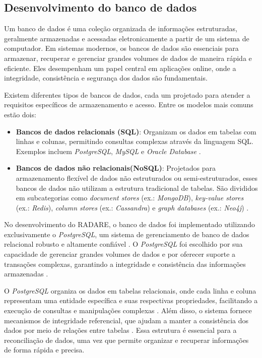 \subsection{Desenvolvimento do banco de dados}

Um banco de dados é uma coleção organizada de informações estruturadas, geralmente armazenadas e acessadas eletronicamente a partir de um sistema de computador. Em sistemas modernos, os bancos de dados são essenciais para armazenar, recuperar e gerenciar grandes volumes de dados de maneira rápida e eficiente. Eles desempenham um papel central em aplicações online, onde a integridade, consistência e segurança dos dados são fundamentais.

Existem diferentes tipos de bancos de dados, cada um projetado para atender a requisitos específicos de armazenamento e acesso. Entre os modelos mais comuns estão dois:

\begin{itemize}
	\item \textbf{Bancos de dados relacionais (SQL)}: Organizam os dados em tabelas com linhas e colunas, permitindo consultas complexas através da linguagem SQL. Exemplos incluem \textit{PostgreSQL}, \textit{MySQL} e \textit{Oracle Database} \cite{relationaldatabases}.

	\item \textbf{Bancos de dados não relacionais(NoSQL)}: Projetados para armazenamento flexível de dados não estruturados ou semi-estruturados, esses bancos de dados não utilizam a estrutura tradicional de tabelas. São divididos em subcategorias como \textit{document stores} (ex.: \textit{MongoDB}), \textit{key-value stores} (ex.: \textit{Redis}), \textit{column stores} (ex.: \textit{Cassandra}) e \textit{graph databases} (ex.: \textit{Neo4j}) \cite{nosqldatabases}.
\end{itemize}

No desenvolvimento do RADARE, o banco de dados foi implementado utilizando exclusivamente o \textit{PostgreSQL}, um sistema de gerenciamento de banco de dados relacional robusto e altamente confiável \cite{postgresql2024}. O \textit{PostgreSQL} foi escolhido por sua capacidade de gerenciar grandes volumes de dados e por oferecer suporte a transações complexas, garantindo a integridade e consistência das informações armazenadas \cite{acidtransactions}.

O \textit{PostgreSQL} organiza os dados em tabelas relacionais, onde cada linha e coluna representam uma entidade específica e suas respectivas propriedades, facilitando a execução de consultas e manipulações complexas \cite{relationaldatabases}. Além disso, o sistema fornece mecanismos de integridade referencial, que ajudam a manter a consistência dos dados por meio de relações entre tabelas \cite{databaseintegrity}. Essa estrutura é essencial para a reconciliação de dados, uma vez que permite organizar e recuperar informações de forma rápida e precisa.

